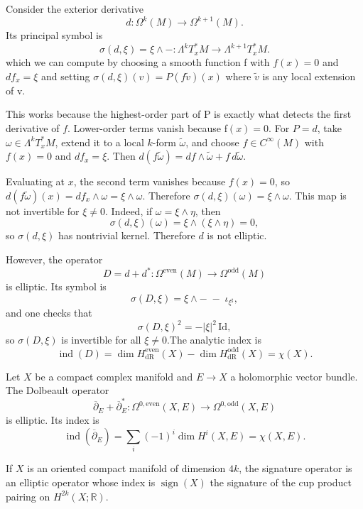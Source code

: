 \documentclass[12pt]{article}
\begin{document}
\begin{example}
Consider the exterior derivative
\[
d:\Omega^k(M)\to \Omega^{k+1}(M).
\]
Its principal symbol is
\[
\sigma(d,\xi)=\xi\wedge -:\Lambda^k T_x^*M\to \Lambda^{k+1}T_x^*M.
\]
which we can compute by choosing a smooth function f with $f(x)=0$ and $df_x=\xi$ and setting $\sigma(d,\xi)(v)=P(f\widetilde v)(x)$ where $\widetilde v$ is any local extension of v.

This works because the highest-order part of P is exactly what detects the first derivative of $f$. Lower-order terms vanish because f$(x)=0$.
For \(P=d\), take \(\omega\in \Lambda^kT_x^*M\), extend it to a local \(k\)-form \(\widetilde\omega\), and choose \(f\in C^\infty(M)\) with \(f(x)=0\) and \(df_x=\xi\). Then \(d(f\widetilde\omega)=df\wedge \widetilde\omega+f\,d\widetilde\omega\). 

Evaluating at \(x\), the second term vanishes because \(f(x)=0\), so \(d(f\widetilde\omega)(x)=df_x\wedge \omega=\xi\wedge\omega\). Therefore \(\sigma(d,\xi)(\omega)=\xi\wedge\omega\).
This map is not invertible for $\xi\neq 0$. Indeed, if $\omega=\xi\wedge\eta$, then
\[
\sigma(d,\xi)(\omega)=\xi\wedge(\xi\wedge\eta)=0,
\]
so $\sigma(d,\xi)$ has nontrivial kernel. Therefore $d$ is not elliptic.

However, the operator
\[
D=d+d^*:\Omega^{\mathrm{even}}(M)\to \Omega^{\mathrm{odd}}(M)
\]
is elliptic. Its symbol is
\[
\sigma(D,\xi)=\xi\wedge - \;-\; \iota_{\xi^\sharp},
\]
and one checks that
\[
\sigma(D,\xi)^2=-|\xi|^2\,\mathrm{Id},
\]
so $\sigma(D,\xi)$ is invertible for all $\xi\neq 0$.The analytic index is
\[
\operatorname{ind}(D)=\dim H^{\mathrm{even}}_{\mathrm{dR}}(X)-\dim H^{\mathrm{odd}}_{\mathrm{dR}}(X)=\chi(X).
\]
\end{example}

\begin{example}
Let \(X\) be a compact complex manifold and \(E\to X\) a holomorphic vector bundle. The Dolbeault operator
\[
\overline\partial_E+\overline\partial_E^*:
\Omega^{0,\mathrm{even}}(X,E)\to \Omega^{0,\mathrm{odd}}(X,E)
\]
is elliptic. Its index is
\[
\operatorname{ind}(\overline\partial_E)
=
\sum_i (-1)^i \dim H^i(X,E)
=
\chi(X,E).
\]
\end{example}

\begin{example}
If \(X\) is an oriented compact manifold of dimension \(4k\), the signature operator is an elliptic operator whose index is $\operatorname{sign}(X)$
the signature of the cup product pairing on \(H^{2k}(X;\mathbb R)\).
\end{example}
\end{document}
